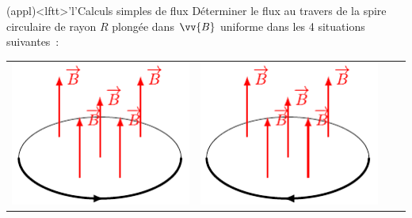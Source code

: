 \documentclass[../../main/main.tex]{subfiles}
\begin{document}

\begin{tcb*}(appl)<lftt>'l'{Calculs simples de flux}
	Déterminer le flux au travers de la spire circulaire de rayon $R$ plongée dans
	$\vv{B}$ uniforme dans les 4 situations suivantes~:
	\begin{center}
		\begin{tabularx}{\linewidth}{Y|Y|Y|Y}
			\includegraphics[width=\linewidth]{fluxexo_a} &
			\includegraphics[width=\linewidth]{fluxexo_b} &

\end{tabularx}
\end{center}
\end{tcb*}
\end{document}
